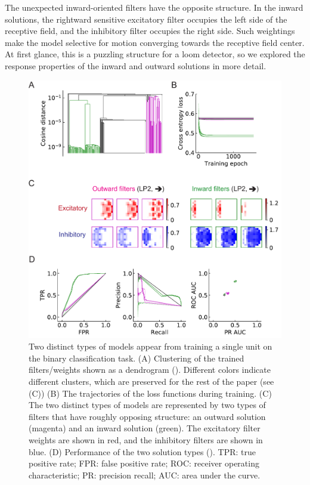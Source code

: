 \documentclass[pdftex,9pt,lineno]{elife}
\begin{document}
The unexpected inward-oriented filters have the opposite structure. In the inward solutions, the rightward sensitive excitatory filter occupies the left side of the receptive field, and the inhibitory filter occupies the right side. Such weightings make the model selective for motion converging towards the receptive field center. At first glance, this is a puzzling structure for a loom detector, so we explored the response properties of the inward and outward solutions in more detail.

\begin{figure}
\includegraphics[width=\linewidth]{figures/trained_results_Q1_paper.pdf}
\caption{Two distinct types of models appear from training a single unit on the binary classification task. (A) Clustering of the trained filters/weights shown as a dendrogram (). Different colors indicate different clusters, which are preserved for the rest of the paper (see (C)) (B) The trajectories of the loss functions during training. (C) The two distinct types of models are represented by two types of filters that have roughly opposing structure: an outward solution (magenta) and an inward solution (green). The excitatory filter weights are shown in red, and the inhibitory filters are shown in blue. (D) Performance of the two solution types (). TPR: true positive rate; FPR: false positive rate; ROC: receiver operating characteristic; PR: precision recall; AUC: area under the curve.}

\end{figure}
\end{document}

